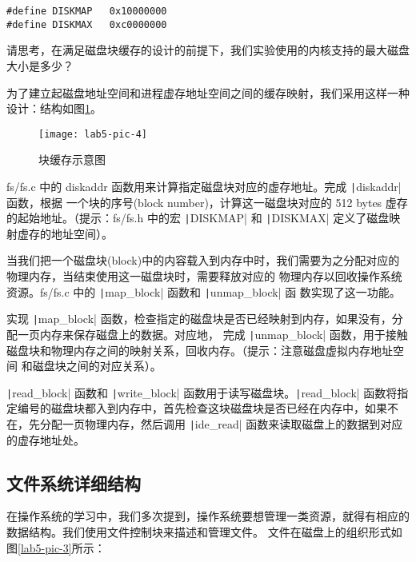 \begin{verbatim}
#define DISKMAP   0x10000000
#define DISKMAX   0xc0000000
\end{verbatim}

\begin{thinking}\label{think-disksize}
请思考，在满足磁盘块缓存的设计的前提下，我们实验使用的内核支持的最大磁盘大小是多少？
\end{thinking}

为了建立起磁盘地址空间和进程虚存地址空间之间的缓存映射，我们采用这样一种设计：结构如图\ref{lab5-pic-4}。

\begin{figure}[htbp]
  \centering
  \texttt{[image: lab5-pic-4]}
  \caption{块缓存示意图}\label{lab5-pic-4}
\end{figure}

\begin{exercise}
fs/fs.c 中的 diskaddr 函数用来计算指定磁盘块对应的虚存地址。完成 \texttt|diskaddr| 函数，根据
一个块的序号(block number)，计算这一磁盘块对应的 512 bytes 虚存的起始地址。（提示：fs/fs.h 中的宏
\texttt|DISKMAP| 和 \texttt|DISKMAX| 定义了磁盘映射虚存的地址空间）。
\end{exercise}

当我们把一个磁盘块(block)中的内容载入到内存中时，我们需要为之分配对应的物理内存，当结束使用这一磁盘块时，需要释放对应的
物理内存以回收操作系统资源。fs/fs.c 中的 \texttt|map_block| 函数和 \texttt|unmap_block| 函
数实现了这一功能。

\begin{exercise}
实现 \texttt|map_block| 函数，检查指定的磁盘块是否已经映射到内存，如果没有，分配一页内存来保存磁盘上的数据。对应地，
完成 \texttt|unmap_block| 函数，用于接触磁盘块和物理内存之间的映射关系，回收内存。（提示：注意磁盘虚拟内存地址空间
和磁盘块之间的对应关系）。
\end{exercise}

\texttt|read_block| 函数和 \texttt|write_block| 函数用于读写磁盘块。\texttt|read_block|
函数将指定编号的磁盘块都入到内存中，首先检查这块磁盘块是否已经在内存中，如果不在，先分配一页物理内存，然后调用
\texttt|ide_read| 函数来读取磁盘上的数据到对应的虚存地址处。

\subsection{文件系统详细结构}

在操作系统的学习中，我们多次提到，操作系统要想管理一类资源，就得有相应的数据结构。我们使用文件控制块来描述和管理文件。
文件在磁盘上的组织形式如图\ref{lab5-pic-3}所示：

